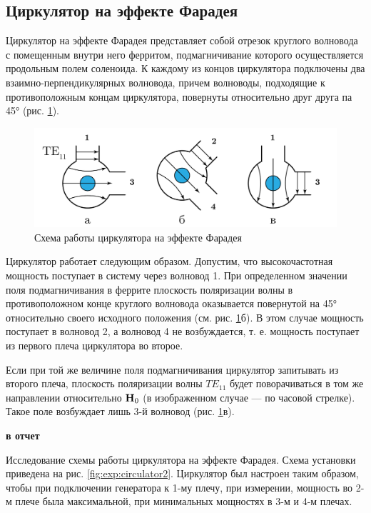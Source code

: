 \subsection{Циркулятор на эффекте Фарадея}
Циркулятор на эффекте Фарадея представляет собой отрезок круглого волновода с помещенным внутри него ферритом,
подмагничивание которого осуществляется продольным полем соленоида. К каждому из концов циркулятора подключены два
взаимно-перпендикулярных волновода, причем волноводы, подходящие к противоположным концам циркулятора, повернуты
относительно друг друга па 45° (рис. \ref{fig:exp:circulator}).
\begin{figure}[h!]
    \centering
    \includegraphics[width = 0.8\linewidth]{imgs/circulator.pdf}
    \caption{Схема работы циркулятора на эффекте Фарадея}
    \label{fig:exp:circulator}
\end{figure}
Циркулятор работает следующим образом. Допустим, что высокочастотная мощность поступает в систему через волновод 1.
 При определенном значении поля
подмагничивания в феррите плоскость поляризации волны в противоположном конце круглого волновода оказывается
повернутой на 45° относительно своего исходного положения (см. рис. \ref{fig:exp:circulator}б). В этом случае мощность
поступает в волновод 2, а волновод 4 не возбуждается, т. е. мощность поступает из первого плеча циркулятора во второе.

Если при той же величине поля подмагничивания циркулятор запитывать из второго плеча, плоскость поляризации волны
$TE_{11}$ будет поворачиваться в том же направлении относительно $\textbf{H}_0$ (в изображенном случае — по часовой стрелке).
 Такое поле возбуждает лишь 3-й волновод (рис. \ref{fig:exp:circulator}в).

\textbf{в отчет} 

Исследование схемы работы циркулятора на эффекте Фарадея. Схема установки приведена на рис. \ref{fig:exp:circulator2}.
Циркулятор был настроен таким образом, чтобы при подключении генератора к 1-му плечу, при измерении, мощность во 2-м
плече была максимальной, при минимальных мощностях в 3-м и 4-м плечах.

